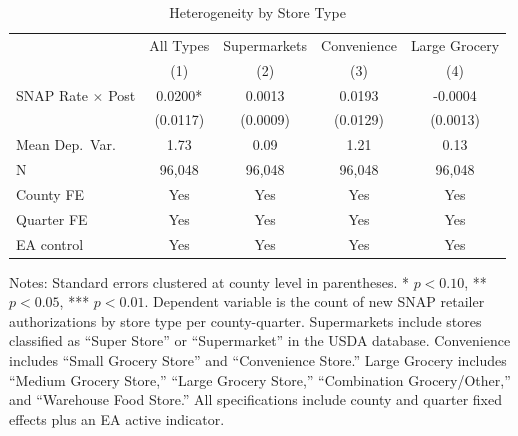 \begin{table}[H]
\centering
\caption{Heterogeneity by Store Type}
\label{tab:storetype}
\begin{threeparttable}
\begin{tabular}{lcccc}
\toprule
 & All Types & Supermarkets & Convenience & Large Grocery \\
 & (1) & (2) & (3) & (4) \\
\midrule
SNAP Rate $\times$ Post & 0.0200* & 0.0013 & 0.0193 & -0.0004 \\
 & (0.0117) & (0.0009) & (0.0129) & (0.0013) \\
Mean Dep.\ Var. & 1.73 & 0.09 & 1.21 & 0.13 \\
N & 96,048 & 96,048 & 96,048 & 96,048 \\
\midrule
County FE & Yes & Yes & Yes & Yes \\
Quarter FE & Yes & Yes & Yes & Yes \\
EA control & Yes & Yes & Yes & Yes \\
\bottomrule
\end{tabular}
\begin{tablenotes}[flushleft]
\small
\item Notes: Standard errors clustered at county level in parentheses. * $p<0.10$, ** $p<0.05$, *** $p<0.01$. Dependent variable is the count of new SNAP retailer authorizations by store type per county-quarter. Supermarkets include stores classified as ``Super Store'' or ``Supermarket'' in the USDA database. Convenience includes ``Small Grocery Store'' and ``Convenience Store.'' Large Grocery includes ``Medium Grocery Store,'' ``Large Grocery Store,'' ``Combination Grocery/Other,'' and ``Warehouse Food Store.'' All specifications include county and quarter fixed effects plus an EA active indicator.
\end{tablenotes}
\end{threeparttable}
\end{table}
